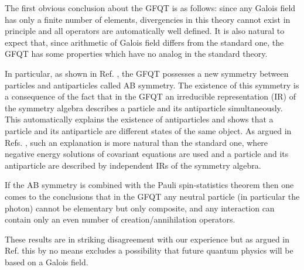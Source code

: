 \documentclass[a4paper,12pt]{article}%
\begin{document}
The first obvious conclusion about the GFQT is as follows: 
since any Galois field has only a finite number of elements, 
divergencies in this theory cannot exist in 
principle and all operators are automatically well defined.
It is also natural to expect that, since arithmetic of Galois 
field differs from the standard one, the GFQT has some 
properties which have no analog in the standard theory.  

In particular, as shown in Ref. \cite{lev3}, the GFQT
possesses a new symmetry between particles and 
antiparticles called AB symmetry. The existence of this
symmetry is a consequence of the fact that in the GFQT
an irreducible representation (IR) of the symmetry
algebra describes a particle and its antiparticle
simultaneously. This automatically explains the
existence of antiparticles and shows that a particle and
its antiparticle are different states of the same object.
As argued in Refs. \cite{lev2,lev3}, such an 
explanation is more natural than the standard one, where
negative energy solutions of covariant equations are used
and a particle and its antiparticle are described by
independent IRs of the symmetry algebra. 

If the AB symmetry is combined with the Pauli 
spin-statistics theorem \cite{Pauli} then one comes
to the conclusions \cite{lev3} that in the GFQT
any neutral particle (in particular the photon) 
cannot be elementary but only composite, and
any interaction can contain only an even number
of creation/annihilation operators.

These results are in striking disagreement with our
experience but as argued in Ref. \cite{lev3} this 
by no means excludes a possibility that future
quantum physics will be based on a Galois field.
\end{document}
